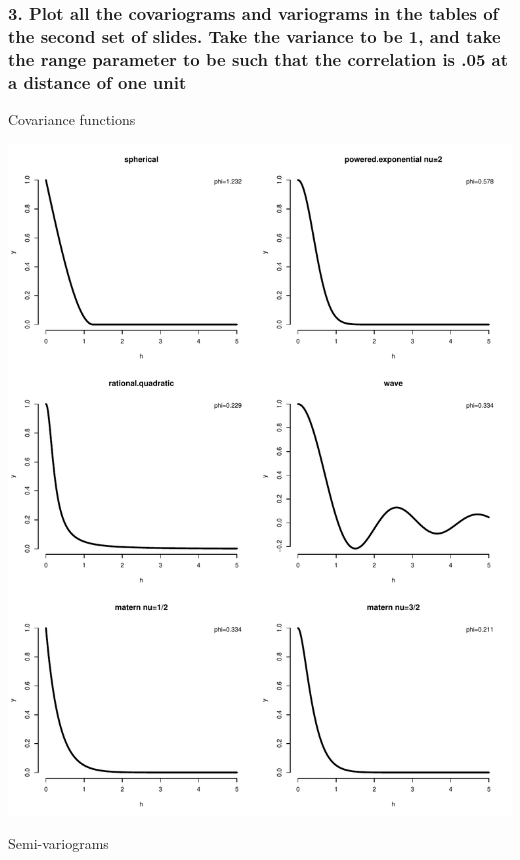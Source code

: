 \documentclass[12pt]{article}
\begin{document}
\newpage

\subsubsection*{3. Plot all the covariograms and variograms in the tables of the second set of slides. Take the variance to be 1, and take the range parameter to be such that the correlation is .05 at a distance of one unit}

Covariance functions

\begin{center}
\includegraphics[scale=0.67]{figs/covariance.pdf}
\end{center}

\newpage

Semi-variograms
\end{document}
